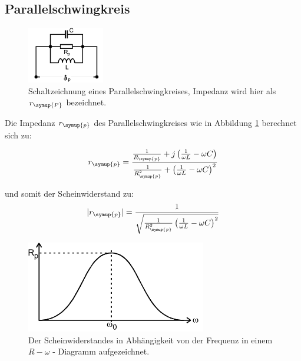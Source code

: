        \subsection{Parallelschwingkreis}
    
    
        \begin{figure}[H]
            \centering
            \includegraphics[width=0.3\textwidth]{images/Parallelschaltung.PNG}
            \caption{Schaltzeichnung eines Parallelschwingkreises, Impedanz wird hier als $r_{\symup{P}}$ bezeichnet.}
            \label{img:para}
        \end{figure}

        \noindent Die Impedanz $r_{\symup{p}}$ des Parallelschwingkreises wie in Abbildung \ref{img:para} berechnet sich zu:
        
    \begin{equation}
        r_{\symup{p}} = \frac{\frac{1}{R_{\symup{p}}}+j \left( \frac{1}{\omega L} - \omega C \right)}{\frac{1}{R^2_{\symup{p}}}+ \left( \frac{1}{\omega L} - \omega C \right)^2}
        \label{eq:Kreis}
    \end{equation}

    \noindent und somit der Scheinwiderstand zu:
    \begin{equation}
        |r_{\symup{p}}|=  \frac{1}{\sqrt{\frac{1}{R^2_{\symup{p}}} \left( \frac{1}{\omega L} - \omega C \right)^2}} \nonumber
    \end{equation}

    \begin{figure}[H]
        \centering
        \includegraphics[width=0.7\textwidth]{images/Scheinwiderstand.PNG}
        \caption{Der Scheinwiderstandes in Abhängigkeit von der Frequenz in einem $R-\omega$ - Diagramm aufgezeichnet\protect \cite{V354}.}
        \label{img:scheinw}
    \end{figure}

